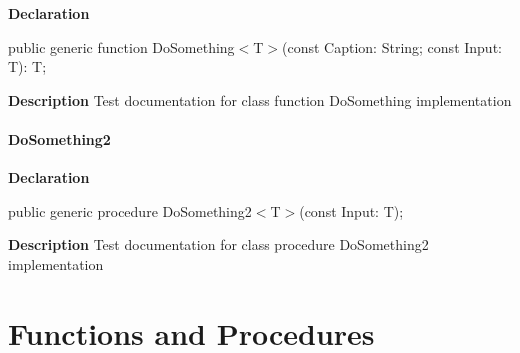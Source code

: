 \documentclass{report}
\begin{document}
\begin{list}{}{
\setlength{\itemindent}{0cm}
\setlength{\listparindent}{0cm}
\setlength{\leftmargin}{\evensidemargin}
\addtolength{\leftmargin}{\tmplength}
\settowidth{\labelsep}{X}
\addtolength{\leftmargin}{\labelsep}
\setlength{\labelwidth}{\tmplength}
}
\begin{flushleft}
\item[\textbf{Declaration}\hfill]
\begin{ttfamily}
public generic function DoSomething{$<$}T{$>$}(const Caption: String; const Input: T): T;\end{ttfamily}


\end{flushleft}
\par
\item[\textbf{Description}]
Test documentation for class function DoSomething implementation

\end{list}
\paragraph*{DoSomething2}\hspace*{\fill}

\begin{list}{}{
\setlength{\itemindent}{0cm}
\setlength{\listparindent}{0cm}
\setlength{\leftmargin}{\evensidemargin}
\addtolength{\leftmargin}{\tmplength}
\settowidth{\labelsep}{X}
\addtolength{\leftmargin}{\labelsep}
\setlength{\labelwidth}{\tmplength}
}
\begin{flushleft}
\item[\textbf{Declaration}\hfill]
\begin{ttfamily}
public generic procedure DoSomething2{$<$}T{$>$}(const Input: T);\end{ttfamily}


\end{flushleft}
\par
\item[\textbf{Description}]
Test documentation for class procedure DoSomething2 implementation

\end{list}
\section{Functions and Procedures}
\end{document}
